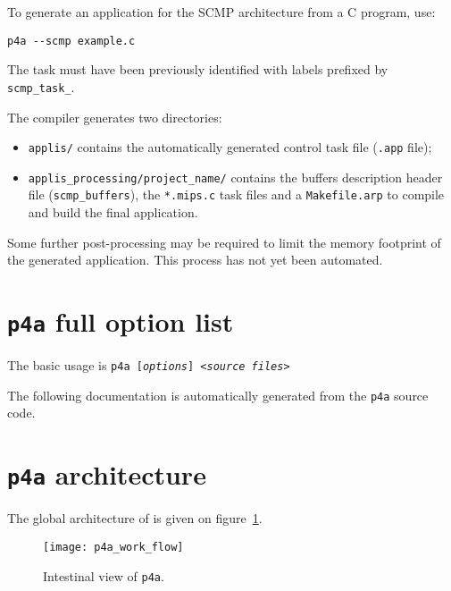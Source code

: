 \documentclass[a4paper]{article}
\begin{document}
To generate an application for the SCMP architecture from a C program, use:
\begin{verbatim}
p4a --scmp example.c
\end{verbatim}
The task must have been previously identified with labels prefixed by
\texttt{scmp\_task\_}.

The compiler generates two directories:
\begin{itemize}
\item \texttt{applis/}  contains the automatically generated control task file (\texttt{.app} file);
\item \texttt{applis\_processing/project\_name/} contains the buffers
  description header file (\texttt{scmp\_buffers}), the
  \texttt{*.mips.c} task files and a \texttt{Makefile.arp} to compile
  and build the final application.
\end{itemize}

Some further post-processing may be required to limit the memory
footprint of the generated application. This process has not yet been
automated.

\section{\protect\texttt{p4a} full option list}
\label{sec:options}

The basic usage is \texttt{p4a [\emph{options}] <\emph{source files}>}

The following documentation is automatically generated from the
\texttt{p4a} source code.




\section{\protect\texttt{p4a} architecture}
\label{sec:p4a-architecture}

The global architecture of \Apfa is given on
figure~\ref{fig:transit_intestinal}.

\begin{figure}
  \texttt{[image: p4a\_work\_flow]}
  \caption{Intestinal view of \texttt{p4a}.}
  \label{fig:transit_intestinal}
\end{figure}
\end{document}
